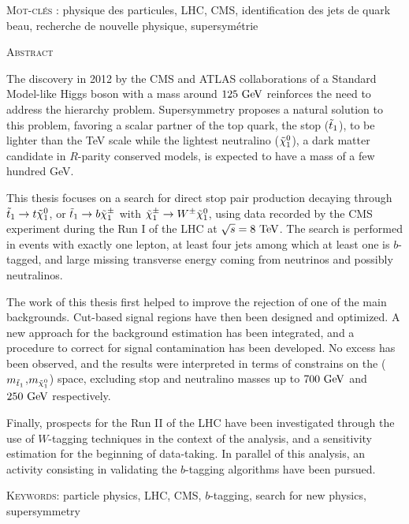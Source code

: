 {\begin{framed}
\textsc{Mot-clés} : physique des particules, LHC, CMS, identification des jets de quark beau, recherche de nouvelle physique, supersymétrie
\end{framed}

\begin{framed}
    \vspace*{-0.7cm}
\begin{center}\textsc{Abstract}\end{center}
    \vspace*{-0.3cm}
    The discovery in 2012 by the CMS and ATLAS collaborations of a Standard Model-like Higgs boson
with a mass around $125~\text{GeV}$ reinforces the need to address the hierarchy problem. Supersymmetry
proposes a natural solution to this problem, favoring a scalar partner of the top quark,
the stop ($\tilde{t}_1$), to be lighter than the TeV scale while the lightest neutralino
($\tilde{\chi}_1^0$), a dark matter candidate in $R$-parity conserved models, is expected to have
a mass of a few hundred GeV.

    This thesis focuses on a search for direct stop pair production decaying through
$\tilde{t}_1 \rightarrow t \tilde{\chi}_1^0$, or $\tilde{t}_1 \rightarrow b \tilde{\chi}_1^\pm$ with
$\tilde{\chi}_1^\pm \rightarrow W^\pm \tilde{\chi}_1^0$, using data recorded by the CMS experiment during
the Run I of the LHC at $\sqrt{s} = 8~\text{TeV}$. The search is performed in events with exactly
one lepton, at least four jets among which at least one is $b$-tagged, and large missing
transverse energy coming from neutrinos and possibly neutralinos.

    The work of this thesis first helped to improve the rejection of one of the main backgrounds.
Cut-based signal regions have then been designed and optimized. A new approach for the background
estimation has been integrated, and a procedure to correct for signal contamination has
been developed. No excess has been observed, and the results were interpreted in terms of
constrains on the ($m_{\tilde{t}_1}$,$m_{\tilde{\chi}_1^0}$) space, excluding stop and neutralino
masses up to $700~\text{GeV}$ and $250~\text{GeV}$ respectively.

    Finally, prospects for the Run II of the LHC have been investigated through the use of
$W$-tagging techniques in the context of the analysis, and a sensitivity estimation for the
beginning of data-taking. In parallel of this analysis, an activity consisting in validating
the $b$-tagging algorithms have been pursued.

\textsc{Keywords}: particle physics, LHC, CMS, $b$-tagging, search for new physics, supersymmetry\end{framed}}
\restoregeometry
